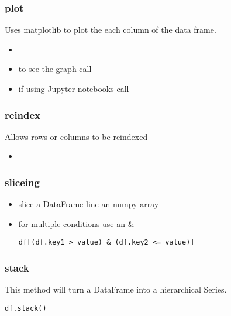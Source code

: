 %
\subsubsection{plot}
Uses matplotlib to plot the each column of the data frame.
  \begin{itemize}

    \item {\color{red}{make sure to import matplotlib before calling this
      method}}

    \item to see the graph call {\color{red}{plt.show()}}

    \item if using Jupyter notebooks call {\color{red}{\%matplotlib inline}}
  \end{itemize}

%
\subsubsection{reindex}
Allows rows or columns to be reindexed
  \begin{itemize}

    \item \color{red}{if no arguments are passed the rows will be reindexed,
      and if the columns argument is passed the columns will be reindexed.}
  \end{itemize}

%
\subsubsection{sliceing}
\begin{itemize}
  \item slice a DataFrame line an numpy array
  \item for multiple conditions use an \&
\begin{lstlisting}
df[(df.key1 > value) & (df.key2 <= value)]
\end{lstlisting}
\end{itemize}

%
\subsubsection{stack}
This method will turn a DataFrame into a hierarchical Series.
{\color{red}{Note: the null values will be removed.}}

\begin{lstlisting}
df.stack()
\end{lstlisting}

